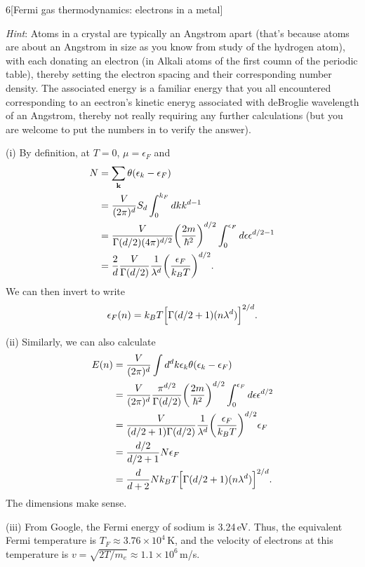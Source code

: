 \documentclass[12pt]{article}
\begin{document}
\begin{problem}{6}[Fermi gas thermodynamics: electrons in a metal]
\begin{enumerate}[label=(\roman*)]
    \textit{Hint}:  Atoms in a crystal are typically an Angstrom apart (that's
    because atoms are about an Angstrom in size as you know from study of the
    hydrogen atom), with each donating an electron (in Alkali atoms of the first
    coumn of the periodic table), thereby setting the electron spacing and their
    corresponding number density. The associated energy is a familiar energy
    that you all encountered corresponding to an eectron's kinetic eneryg
    associated with deBroglie wavelength of an Angstrom, thereby not really
    requiring any further calculations (but you are welcome to put the numbers
    in to verify the answer).
\end{enumerate}
\begin{solution}
(i) By definition, at $T=0$, $\mu=\epsilon_F$ and
\begin{align}
    N&=\sum_{\vb{k}}\theta(\epsilon_k-\epsilon_F) \notag\\
     &=\frac{V}{(2\pi)^d}S_d\int_0^{k_F} dk
     k^{d-1}\notag\\
     &=\frac{V}{\Gamma(d/2)(4\pi)^{d/2}}\qty(\frac{2m}{\hbar^2})^{d/2}
     \int_0^{\epsilon_F}d\epsilon \epsilon^{d/2-1}\notag\\
     &=\frac{2}{d}\frac{V}{\Gamma(d/2)}\frac1{\lambda^d}\qty(\frac{\epsilon_F}{k_BT})^{d/2}.
\end{align}
We can then invert to write
\begin{equation}\label{p6b:eps}
    \epsilon_F(n)=k_BT\qty[\Gamma(d/2+1)(n\lambda^d)]^{2/d}. 
\end{equation}

(ii) Similarly, we can also calculate
\begin{align}
    E(n)&=\frac{V}{(2\pi)^d}\int
    d^dk\epsilon_k\theta(\epsilon_k-\epsilon_F)\notag\\
        &=\frac{V}{(2\pi)^d}\frac{\pi^{d/2}}{\Gamma(d/2)}\qty(\frac{2m}{\hbar^2})^{d/2}\int_0^{\epsilon_F}d\epsilon
        \epsilon^{d/2}\notag\\
        &=\frac{V}{(d/2+1)\Gamma(d/2)}\frac1{\lambda^d}\qty(\frac{\epsilon_F}{k_BT})^{d/2}\epsilon_F\notag\\
        &=\frac{d/2}{d/2+1}N\epsilon_F\notag\\
        &=\frac{d}{d+2}Nk_BT\qty[\Gamma(d/2+1)(n\lambda^d)]^{2/d}.
\end{align}
The dimensions make sense.

(iii) From Google, the Fermi energy of sodium is 3.24\,\si{eV}. Thus, the
equivalent Fermi temperature is $T_F\approx3.76\times10^4$\,\si{K}, and the
velocity of electrons at this temperature is
$v=\sqrt{2T/m_e}\approx1.1\times10^6$\,\si{m/s}.
\end{solution}


\end{problem}
\end{document}
